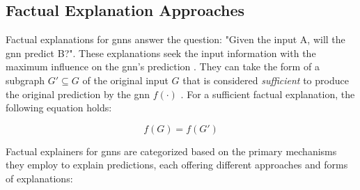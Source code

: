 \subsection{Factual Explanation Approaches}
\label{s_ExplainingGNNs_Factual}

Factual explanations for \glspl{gnn} answer the question: "Given the input A, will the \gls{gnn} predict B?". These explanations seek the input information with the maximum influence on the \gls{gnn}'s prediction \cite{kakkad_survey_2023}. They can take the form of a subgraph $G' \subseteq G$ of the original input $G$ \cite{kakkad_survey_2023} that is considered \textit{sufficient} to produce the original prediction by the \gls{gnn} $f(\cdot)$ \cite{tan_learning_2022}. For a sufficient factual explanation, the following equation holds:

\begin{equation}
    f(G) = f(G')
\end{equation}

Factual explainers for \glspl{gnn} are categorized based on the primary mechanisms they employ to explain predictions, each offering different approaches and forms of explanations:

